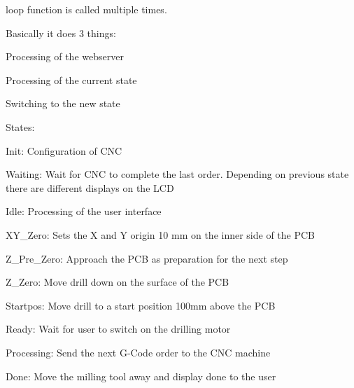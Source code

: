 loop function is called multiple times. 

Basically it does 3 things\-:
\begin{DoxyEnumerate}
\item Processing of the webserver
\item Processing of the current state
\item Switching to the new state 
\end{DoxyEnumerate}States\-:
\begin{DoxyItemize}
\item Init\-: Configuration of C\-N\-C\par

\item Waiting\-: Wait for C\-N\-C to complete the last order. Depending on previous state there are different displays on the L\-C\-D\par

\item Idle\-: Processing of the user interface\par

\item X\-Y\-\_\-\-Zero\-: Sets the X and Y origin 10 mm on the inner side of the P\-C\-B\par

\item Z\-\_\-\-Pre\-\_\-\-Zero\-: Approach the P\-C\-B as preparation for the next step\par

\item Z\-\_\-\-Zero\-: Move drill down on the surface of the P\-C\-B\par

\item Startpos\-: Move drill to a start position 100mm above the P\-C\-B\par

\item Ready\-: Wait for user to switch on the drilling motor\par

\item Processing\-: Send the next G-\/\-Code order to the C\-N\-C machine\par

\item Done\-: Move the milling tool away and display done to the user\par
 
\end{DoxyItemize}\hypertarget{_c_n_c_interface_8ino_a6ab3866008f887c900e59b452631a48d}{
}
